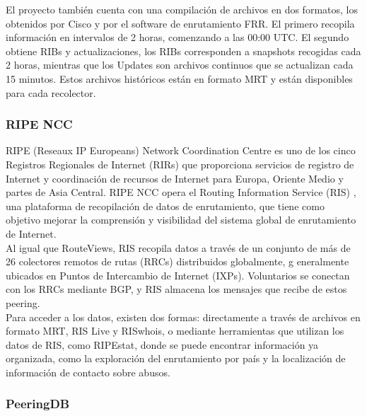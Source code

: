 El proyecto también cuenta con una compilación de archivos en dos formatos, los obtenidos por Cisco y por el software de enrutamiento FRR. 
El primero recopila información en intervalos de 2 horas, comenzando a las 00:00 UTC. El segundo obtiene RIBs y actualizaciones, los RIBs 
corresponden a snapshots recogidas cada 2 horas, mientras que los Updates son archivos continuos que se actualizan cada 15 minutos. 
Estos archivos históricos están en formato MRT y están disponibles para cada recolector.\\

\subsubsection{RIPE NCC} \label{sec:anexo_ripe_ncc}


RIPE (Reseaux IP Europeans) Network Coordination Centre es uno de los cinco Registros Regionales de Internet (RIRs) que proporciona servicios de 
registro de Internet y coordinación de recursos de Internet para Europa, Oriente Medio y partes de Asia Central.
RIPE NCC opera el Routing Information Service (RIS) \cite{RIPE-RIS}, una plataforma de recopilación de datos de enrutamiento, que tiene como 
objetivo mejorar la comprensión y visibilidad del sistema global de enrutamiento de Internet.\\

Al igual que RouteViews, RIS recopila datos a través de un conjunto de más de 26 colectores remotos de rutas (RRCs) distribuidos globalmente, g
eneralmente ubicados en Puntos de Intercambio de Internet (IXPs).  Voluntarios se conectan con los RRCs mediante BGP, y RIS almacena los mensajes 
que recibe de estos peering.\\

Para acceder a los datos, existen dos formas: directamente a través de archivos en formato MRT, RIS Live y RISwhois, o mediante herramientas que 
utilizan los datos de RIS, como RIPEstat, donde se puede encontrar información ya organizada, como la exploración del enrutamiento por país y la 
localización de información de contacto sobre abusos.\\


\subsubsection{PeeringDB} \label{sec:anexo_the_peeringDB}


